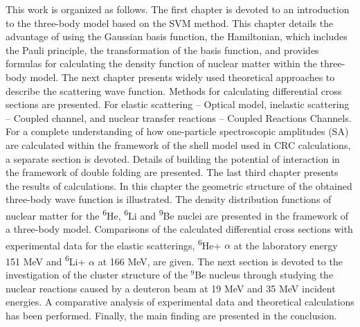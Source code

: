 \documentclass[
12pt, %
oneside, %
english, %
onehalfspacing, %
onehalfspacing, %
headsepline, %
]{MastersDoctoralThesis} %
\newcommand{\he}{\textsuperscript{6}He\xspace}
\newcommand{\li}{\textsuperscript{6}Li\xspace}
\newcommand{\be}{\textsuperscript{9}Be\xspace}
\begin{document}
This work is organized as follows. The first chapter is devoted to an introduction to the three-body model based on the SVM method. This chapter details the advantage of using the Gaussian basis function, the Hamiltonian, which includes the Pauli principle, the transformation of the basis function, and provides formulas for calculating the density function of nuclear matter within the three-body model. 
The next chapter presents widely used theoretical approaches to describe the scattering wave function. 
Methods for calculating differential cross sections  are presented. For elastic scattering -- Optical model, inelastic scattering -- Coupled channel, and nuclear transfer reactions -- Coupled Reactions Channels. 
For a complete understanding of how one-particle spectroscopic amplitudes (SA) are calculated within the framework of the shell model used in CRC calculations, a separate section is devoted.
Details of building the potential of interaction in the framework of double folding are presented.
The last third chapter presents the results of calculations. 
In this chapter the geometric structure of the obtained three-body wave function is illustrated. 
The density distribution functions of nuclear matter for the \he, \li and \be nuclei are presented in the framework of a three-body model. 
Comparisons of the calculated differential cross sections with experimental data for the elastic scatterings, \he + $\alpha$ at the laboratory energy 151 MeV  and \li + $\alpha$ at 166 MeV, are given. 
The next section is devoted to the investigation of the cluster structure of the ${}^9$Be nucleus through studying the nuclear reactions caused by a deuteron beam at 19 MeV and 35 MeV incident energies. 
A comparative analysis of experimental data and theoretical calculations has been performed.
Finally, the main finding are presented in the conclusion.

\label{Chapter1} %


\newcommand{\keyword}[1]{\textbf{#1}}
\newcommand{\tabhead}[1]{\textbf{#1}}
\newcommand{\code}[1]{\texttt{#1}}
\newcommand{\file}[1]{\texttt{\bfseries#1}}
\newcommand{\option}[1]{\texttt{\itshape#1}}

\end{document}
